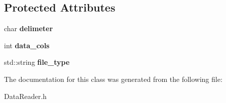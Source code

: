 \subsection*{Protected Attributes}
\begin{DoxyCompactItemize}
\item 
\mbox{\label{classDataReader_a1d06e1b647a16667a9f9e4f88b06316c}} 
char {\bfseries delimeter}
\item 
\mbox{\label{classDataReader_abf88eedea2e0ef00584db595e1ced71a}} 
int {\bfseries data\+\_\+cols}
\item 
\mbox{\label{classDataReader_a241518d6e543c452ac421659fa34e6cf}} 
std\+::string {\bfseries file\+\_\+type}
\end{DoxyCompactItemize}


The documentation for this class was generated from the following file\+:\begin{DoxyCompactItemize}
\item 
Data\+Reader.\+h\end{DoxyCompactItemize}
